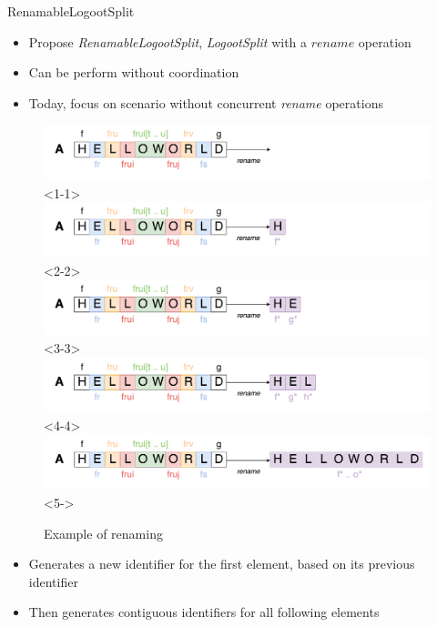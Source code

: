 \documentclass[10pt]{beamer}
\begin{document}
\begin{frame}{RenamableLogootSplit}
  \begin{itemize}
    \item Propose \emph{RenamableLogootSplit}, \emph{LogootSplit} with a $rename$ operation
    \item Can be perform without coordination
    \item Today, focus on scenario without concurrent \emph{rename} operations
  \end{itemize}
  \begin{figure}
    \includegraphics[scale=0.11]{img/renaming-1.png}<1-1>
    \includegraphics[scale=0.11]{img/renaming-2.png}<2-2>
    \includegraphics[scale=0.11]{img/renaming-3.png}<3-3>
    \includegraphics[scale=0.11]{img/renaming-4.png}<4-4>
    \includegraphics[scale=0.11]{img/renaming-5.png}<5->
    \caption{Example of renaming}
  \end{figure}
  \begin{itemize}
    \item<2-> Generates a new identifier for the first element, based on its previous identifier
    \item<3-> Then generates contiguous identifiers for all following elements
  \end{itemize}
\end{frame}
\end{document}
